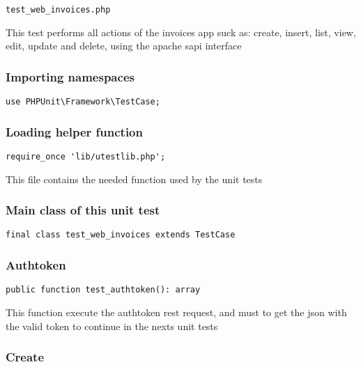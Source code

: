 \documentclass[a4paper]{article}
\begin{document}
\begin{lstlisting}
test_web_invoices.php
\end{lstlisting}

This test performs all actions of the invoices app suck as: create, insert,
list, view, edit, update and delete, using the apache sapi interface

\hypertarget{toc439}{}
\subsubsection{Importing namespaces}

\begin{lstlisting}
use PHPUnit\Framework\TestCase;
\end{lstlisting}

\hypertarget{toc440}{}
\subsubsection{Loading helper function}

\begin{lstlisting}
require_once 'lib/utestlib.php';
\end{lstlisting}

This file contains the needed function used by the unit tests

\hypertarget{toc441}{}
\subsubsection{Main class of this unit test}

\begin{lstlisting}
final class test_web_invoices extends TestCase
\end{lstlisting}

\hypertarget{toc442}{}
\subsubsection{Authtoken}

\begin{lstlisting}
public function test_authtoken(): array
\end{lstlisting}

This function execute the authtoken rest request, and must to get the
json with the valid token to continue in the nexts unit tests

\hypertarget{toc443}{}
\subsubsection{Create}
\end{document}
